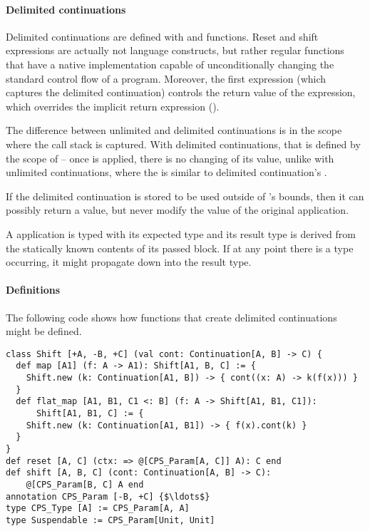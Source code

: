 \paragraph{Delimited continuations}

Delimited continuations are defined with  and  functions. Reset and shift expressions are actually not language constructs, but rather regular functions that have a native implementation capable of unconditionally changing the standard control flow of a program. Moreover, the first  expression (which captures the delimited continuation) controls the return value of the  expression, which overrides the implicit return expression ().

The difference between unlimited and delimited continuations is in the scope where the call stack is captured. With delimited continuations, that is defined by the scope of  -- once  is applied, there is no changing of its value, unlike with unlimited continuations, where the  is similar to delimited continuation's . 

If the delimited continuation is stored to be used outside of 's bounds, then it can possibly return a value, but never modify the value of the original  application.

A  application is typed with its expected type and its result type is derived from the statically known contents of its passed block. If at any point there is a  type occurring, it might propagate down into the result type. 

\paragraph{Definitions}
The following code shows how functions that create delimited continuations might be defined. 
\begin{lstlisting}
class Shift [+A, -B, +C] (val cont: Continuation[A, B] -> C) {
  def map [A1] (f: A -> A1): Shift[A1, B, C] := {
    Shift.new (k: Continuation[A1, B]) -> { cont((x: A) -> k(f(x))) }
  }
  def flat_map [A1, B1, C1 <: B] (f: A -> Shift[A1, B1, C1]): 
      Shift[A1, B1, C] := {
    Shift.new (k: Continuation[A1, B1]) -> { f(x).cont(k) }
  }
}
def reset [A, C] (ctx: => @[CPS_Param[A, C]] A): C end
def shift [A, B, C] (cont: Continuation[A, B] -> C): 
    @[CPS_Param[B, C] A end
annotation CPS_Param [-B, +C] {$\ldots$}
type CPS_Type [A] := CPS_Param[A, A]
type Suspendable := CPS_Param[Unit, Unit]
\end{lstlisting}


